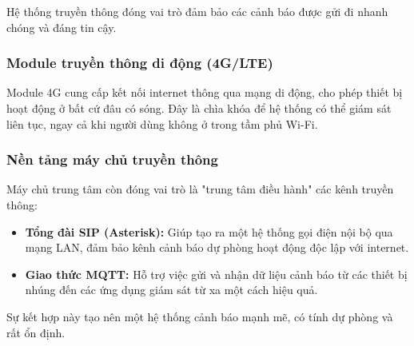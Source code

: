 Hệ thống truyền thông đóng vai trò đảm bảo các cảnh báo được gửi đi nhanh chóng và đáng tin cậy.

\subsubsection{Module truyền thông di động (4G/LTE)}
Module 4G cung cấp kết nối internet thông qua mạng di động, cho phép thiết bị hoạt động ở bất cứ đâu có sóng. Đây là chìa khóa để hệ thống có thể giám sát liên tục, ngay cả khi người dùng không ở trong tầm phủ Wi-Fi.

\subsubsection{Nền tảng máy chủ truyền thông}
Máy chủ trung tâm còn đóng vai trò là "trung tâm điều hành" các kênh truyền thông:
\begin{itemize}
    \item \textbf{Tổng đài SIP (Asterisk):} Giúp tạo ra một hệ thống gọi điện nội bộ qua mạng LAN, đảm bảo kênh cảnh báo dự phòng hoạt động độc lập với internet.
    \item \textbf{Giao thức MQTT:} Hỗ trợ việc gửi và nhận dữ liệu cảnh báo từ các thiết bị nhúng đến các ứng dụng giám sát từ xa một cách hiệu quả.
\end{itemize}
Sự kết hợp này tạo nên một hệ thống cảnh báo mạnh mẽ, có tính dự phòng và rất ổn định.
